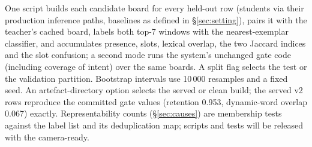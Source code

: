 One script builds each candidate board for every held-out row (students
via their production inference paths, baselines as defined in
\S\ref{sec:setting}), pairs it with the teacher's cached board, labels
both top-7 windows with the nearest-exemplar classifier, and accumulates
presence, slots, lexical overlap, the two Jaccard indices and the slot
confusion; a second mode runs the system's unchanged gate code (including
coverage of intent) over the same boards. A split flag selects the test
or the validation partition. Bootstrap intervals use 10\,000 resamples
and a fixed seed. An artefact-directory option selects the served or
clean build; the served v2 rows reproduce the committed gate values
(retention 0.953, dynamic-word overlap 0.067) exactly.
Representability counts (\S\ref{sec:causes}) are membership tests against
the label list and its deduplication map; scripts and tests will be
released with the camera-ready.


